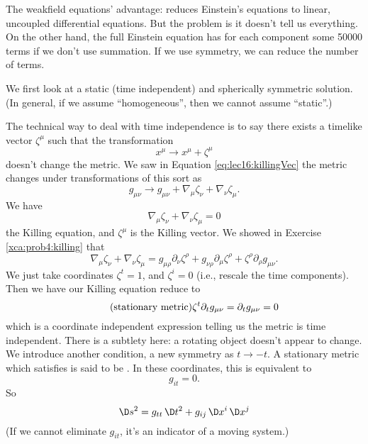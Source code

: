 
The weakfield equations' advantage: reduces Einstein's equations
to linear, uncoupled differential equations. But the problem is
it doesn't tell us everything. On the other hand, the full
Einstein equation has for each component some 50000 terms if we
don't use summation. If we use symmetry, we can reduce the number
of terms.

We first look at a static (time independent) and spherically
symmetric solution. (In general, if we assume ``homogeneous'', then
we cannot assume ``static''.) 

The technical way to deal with time independence is to say there
exists a timelike vector $\zeta^{\mu}$ such that the transformation
\begin{equation}
x^{\mu}\to x^{\mu}+\zeta^{\mu}
\end{equation}
doesn't change the metric. We saw in Equation \eqref{eq:lec16:killingVec}
the metric changes under transformations of this sort as
\begin{equation}
g_{\mu\nu}\to
g_{\mu\nu}+\nabla_{\mu}\zeta_{\nu}+\nabla_{\nu}\zeta_{\mu}.
\end{equation}
We have
\begin{equation}
\nabla_{\mu}\zeta_{\nu}+\nabla_{\nu}\zeta_{\mu}=0
\end{equation}
the Killing equation, and $\zeta^{\mu}$ is the Killing vector. We
showed in Exercise \ref{xca:prob4:killing} that
\begin{equation}
\nabla_{\mu}\zeta_{\nu}+\nabla_{\nu}\zeta_{\mu}=
g_{\mu\rho}\partial_{\nu}\zeta^{\rho}
+g_{\nu\rho}\partial_{\mu}\zeta^{\rho}
+\zeta^{\rho}\partial_{\rho}g_{\mu\nu}.
\end{equation}
We just take coordinates $\zeta^{t}=1$, and $\zeta^{i}=0$ (i.e.,
rescale the time components). Then we have our Killing equation
reduce to
\begin{equation*}\tag{\mbox{stationary metric}}
\zeta^{t}\partial_{t}g_{\mu\nu}=\partial_{t}g_{\mu\nu}=0
\end{equation*}
which is a coordinate independent expression telling us the
metric is time independent. There is a subtlety here: a rotating
object doesn't appear to change. We introduce another condition,
a new symmetry as $t\to-t$. A stationary metric which satisfies
is said to be . In these coordinates, this is
equivalent to 
\begin{equation}
g_{it}=0.
\end{equation}
So
\begin{equation}
\D s^{2}=g_{tt}\,\D t^{2}+g_{ij}\,\D x^{i}\,\D x^{j}
\end{equation}
(If we cannot eliminate $g_{it}$, it's an indicator of a moving system.)

